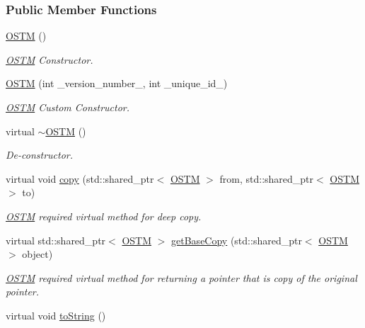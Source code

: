 \subsubsection*{Public Member Functions}
\begin{DoxyCompactItemize}
\item 
\hyperlink{class_o_s_t_m_a968edf778668bd0ec7603f0571619196}{O\+S\+TM} ()
\begin{DoxyCompactList}\small\item\em \hyperlink{class_o_s_t_m}{O\+S\+TM} Constructor. \end{DoxyCompactList}\item 
\hyperlink{class_o_s_t_m_a2314f55a127b94aa8a51d19ba798401e}{O\+S\+TM} (int \+\_\+version\+\_\+number\+\_\+, int \+\_\+unique\+\_\+id\+\_\+)
\begin{DoxyCompactList}\small\item\em \hyperlink{class_o_s_t_m}{O\+S\+TM} Custom Constructor. \end{DoxyCompactList}\item 
virtual \hyperlink{class_o_s_t_m_a30a17d73d0259c60eeab72d6dfa9ceb1}{$\sim$\+O\+S\+TM} ()
\begin{DoxyCompactList}\small\item\em De-\/constructor. \end{DoxyCompactList}\item 
virtual void \hyperlink{class_o_s_t_m_a535d90fced5adbb70312c92f3778e08d}{copy} (std\+::shared\+\_\+ptr$<$ \hyperlink{class_o_s_t_m}{O\+S\+TM} $>$ from, std\+::shared\+\_\+ptr$<$ \hyperlink{class_o_s_t_m}{O\+S\+TM} $>$ to)\hypertarget{class_o_s_t_m_a535d90fced5adbb70312c92f3778e08d}{}\label{class_o_s_t_m_a535d90fced5adbb70312c92f3778e08d}

\begin{DoxyCompactList}\small\item\em \hyperlink{class_o_s_t_m}{O\+S\+TM} required virtual method for deep copy. \end{DoxyCompactList}\item 
virtual std\+::shared\+\_\+ptr$<$ \hyperlink{class_o_s_t_m}{O\+S\+TM} $>$ \hyperlink{class_o_s_t_m_a0bfa3763bd441407dd6365f42714f94c}{get\+Base\+Copy} (std\+::shared\+\_\+ptr$<$ \hyperlink{class_o_s_t_m}{O\+S\+TM} $>$ object)\hypertarget{class_o_s_t_m_a0bfa3763bd441407dd6365f42714f94c}{}\label{class_o_s_t_m_a0bfa3763bd441407dd6365f42714f94c}

\begin{DoxyCompactList}\small\item\em \hyperlink{class_o_s_t_m}{O\+S\+TM} required virtual method for returning a pointer that is copy of the original pointer. \end{DoxyCompactList}\item 
virtual void \hyperlink{class_o_s_t_m_a513396a115f2987fd07c203309ae8a59}{to\+String} ()\hypertarget{class_o_s_t_m_a513396a115f2987fd07c203309ae8a59}{}\label{class_o_s_t_m_a513396a115f2987fd07c203309ae8a59}


\end{DoxyCompactItemize}
